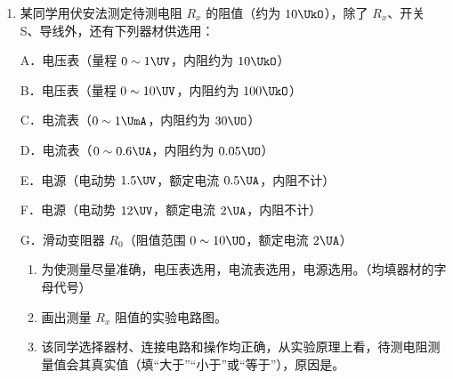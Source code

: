 \documentclass[\gkver]{gaokaozhenti}
\begin{document}
\begin{enumerate}
\begin{enumerate}
\begin{enumerate}
		{figs/09b.png}
		{figs/09c.png}
		{figs/09d.png}
	\end{enumerate}
	\item
	某同学用伏安法测定待测电阻 $R_{x}$ 的阻值（约为 $10\UkO$），除了 $R_{x}$、开关 S、导线外，还有下列器材供选用：

	A．电压表（量程 $0 \sim 1\UV$，内阻约为 $10\UkO$）

	B．电压表（量程 $0 \sim 10\UV$，内阻约为 $100\UkO$）

	C．电流表（$0 \sim 1\UmA$，内阻约为 $30\UO$）

	D．电流表（$0 \sim 0.6\UA$，内阻约为 $0.05\UO$）

	E．电源（电动势 $1.5\UV$，额定电流 $0.5\UA$，内阻不计）

	F．电源（电动势 $12\UV$，额定电流 $2\UA$，内阻不计）

	G．滑动变阻器 $R_{0}$（阻值范围 $0 \sim 10\UO$，额定电流 $2\UA$）

	\begin{enumerate}
		\item
		为使测量尽量准确，电压表选用，电流表选用，电源选用。（均填器材的字母代号）
		\item
		画出测量 $R_{x}$ 阻值的实验电路图。
		\item
		该同学选择器材、连接电路和操作均正确，从实验原理上看，待测电阻测量值会其真实值（填“大于”“小于”或“等于”），原因是。
	\end{enumerate}
\end{enumerate}

\end{enumerate}
\end{document}
